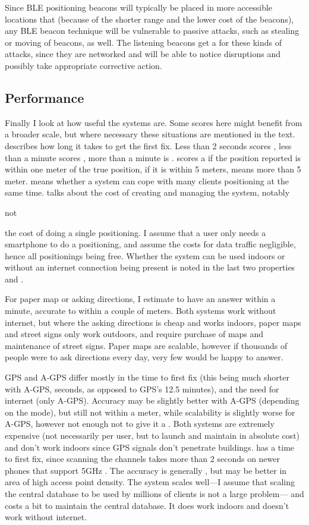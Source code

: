 Since BLE positioning beacons will typically be placed in more accessible locations that \wifi (because of the shorter range and the lower cost of the beacons), any BLE beacon technique will be vulnerable to passive attacks, such as stealing or moving of beacons, as well.
The listening beacons get a \maybe for these kinds of attacks, since they are networked and will be able to notice disruptions and possibly take appropriate corrective action.

\subsection{Performance}
Finally I look at how useful the systems are.
Some scores here might benefit from a broader scale, but where necessary these situations are mentioned in the text.
 describes how long it takes to get the first fix.
Less than 2 seconds scores \yes, less than a minute scores \maybe, more than a minute is \no.
 scores a \yes if the position reported is within one meter of the true position, \maybe if it is within 5 meters, \no means more than 5 meter.
 means whether a system can cope with many clients positioning at the same time.
 talks about the cost of creating and managing the system, notably \begin{em}not\end{em} the cost of doing a single positioning.
I assume that a user only needs a smartphone to do a positioning, and assume the costs for data traffic negligible, hence all positionings being free.
Whether the system can be used indoors or without an internet connection being present is noted in the last two properties  and .

For paper map or asking directions, I estimate to have an answer within a minute, accurate to within a couple of meters.
Both systems work without internet, but where the asking directions is cheap and works indoors, paper maps and street signs only work outdoors, and require purchase of maps and maintenance of street signs.
Paper maps are scalable, however if thousands of people were to ask directions every day, very few would be happy to answer.

GPS and A-GPS differ mostly in the time to first fix (this being much shorter with A-GPS, seconds, as opposed to GPS's 12.5 minutes), and the need for internet (only A-GPS).
Accuracy may be slightly better with A-GPS (depending on the mode), but still not within a meter, while scalability is slightly worse for A-GPS, however not enough not to give it a \yes.
Both systems are extremely expensive (not necessarily per user, but to launch and maintain in absolute cost) and don't work indoors since GPS signals don't penetrate buildings.
\Wifi has a \maybe time to first fix, since scanning the \wifi channels takes more than 2 seconds on newer phones that support 5GHz \wifi.
The accuracy is generally \no, but may be better in area of high access point density.
The system scales well---I assume that scaling the central database to be used by millions of clients is not a large problem--- and costs a bit to maintain the central database.
It does work indoors and doesn't work without internet.

